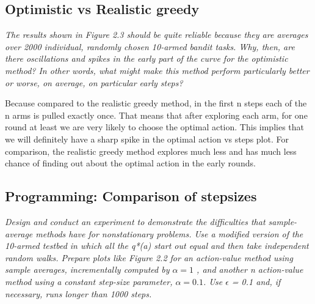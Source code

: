 \documentclass[12pt,a4paper]{article}
\begin{document}
\subsection{Optimistic vs Realistic greedy}
\textit{The results shown in Figure 2.3 should be quite reliable because they are averages over 2000 individual, randomly chosen 10-armed bandit tasks. Why, then, are there oscillations and spikes in the early part of the curve for the optimistic method? In other words, what might make this method perform particularly better or worse, on average, on particular early steps?}

Because compared to the realistic greedy method, in the first n steps each of the n arms is pulled exactly once. That means that after exploring each arm, for one round at least we are very likely to choose the optimal action. This  implies that we will definitely have a sharp spike in the optimal action vs steps plot. For comparison, the realistic greedy method explores much less and has much less chance of finding out about the optimal action in the early rounds. 

\subsection{Programming: Comparison of stepsizes}
\textit{Design and conduct an experiment to demonstrate the difficulties that sample-average methods have for nonstationary problems. Use a modified version of the 10-armed testbed in which all the q*(a) start out equal and then take independent random walks. Prepare plots like Figure 2.2 for an action-value method using sample averages, incrementally computed by $\alpha = 1$ , and another n action-value method using a constant step-size parameter, $\alpha= 0.1$. Use $\epsilon$ = 0.1 and, if necessary, runs longer than 1000 steps.} \\ 
\end{document}
